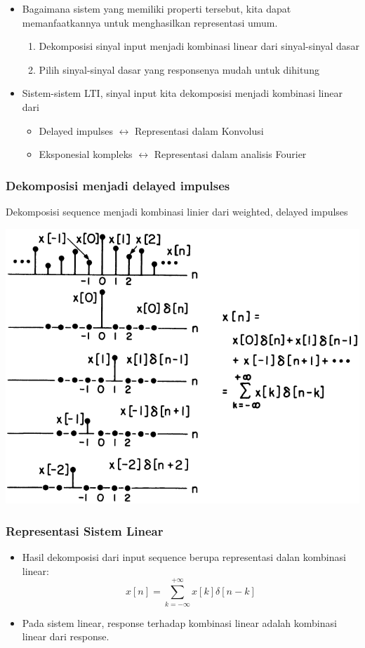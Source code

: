 \documentclass[pdflatex,compress,mathserif]{beamer}
\begin{document}
\begin{frame}
	\begin{itemize}
		\item Bagaimana sistem yang memiliki properti tersebut, kita dapat memanfaatkannya untuk menghasilkan representasi umum. 
		\begin{enumerate}
			\item Dekomposisi sinyal input menjadi kombinasi linear dari sinyal-sinyal dasar
			\item Pilih sinyal-sinyal dasar yang responsenya mudah untuk dihitung
		\end{enumerate}
		\item Sistem-sistem LTI, sinyal input kita dekomposisi menjadi kombinasi linear dari
		\begin{itemize}
			\item Delayed impulses $\leftrightarrow$ Representasi dalam Konvolusi
			\item Eksponesial kompleks $\leftrightarrow$ Representasi dalam analisis Fourier
		\end{itemize}
	\end{itemize}
\end{frame}

\begin{frame}
	\frametitle{Dekomposisi menjadi delayed impulses}
	Dekomposisi sequence menjadi kombinasi linier dari weighted, delayed impulses
	\begin{center}
		\includegraphics[width=0.7\linewidth]{img/img01}
	\end{center}
\end{frame}

\begin{frame}
	\frametitle{Representasi Sistem Linear}
	\begin{itemize}
		\item Hasil dekomposisi dari input sequence berupa representasi dalan kombinasi linear:
		\begin{equation*}
		x[n] = \sum\limits_{k = -\infty}^{+\infty} x[k]\delta[n-k]
		\end{equation*}
		\item Pada sistem linear, response terhadap kombinasi linear adalah kombinasi linear dari response.
	\end{itemize}
\end{frame}
\end{document}

